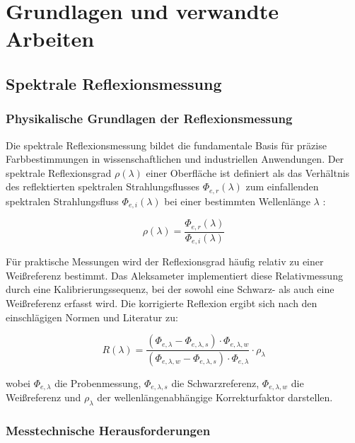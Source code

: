 \chapter{Grundlagen und verwandte Arbeiten}

\section{Spektrale Reflexionsmessung}

\subsection{Physikalische Grundlagen der Reflexionsmessung}

Die spektrale Reflexionsmessung bildet die fundamentale Basis für präzise Farbbestimmungen in wissenschaftlichen und industriellen Anwendungen. Der spektrale Reflexionsgrad $\rho(\lambda)$ einer Oberfläche ist definiert als das Verhältnis des reflektierten spektralen Strahlungsflusses $\Phi_{e,r}(\lambda)$ zum einfallenden spektralen Strahlungsfluss $\Phi_{e,i}(\lambda)$ bei einer bestimmten Wellenlänge $\lambda$ \parencite{DIN5036-1}:

\begin{equation}
\rho(\lambda) = \frac{\Phi_{e,r}(\lambda)}{\Phi_{e,i}(\lambda)}
\label{eq:reflexionsgrad}
\end{equation}

Für praktische Messungen wird der Reflexionsgrad häufig relativ zu einer Weißreferenz bestimmt. Das Aleksameter implementiert diese Relativmessung durch eine Kalibrierungssequenz, bei der sowohl eine Schwarz- als auch eine Weißreferenz erfasst wird. Die korrigierte Reflexion ergibt sich nach den einschlägigen Normen und Literatur \parencite{DIN5036-3, Hentschel2002, Baer2020, Piotrowska2022} zu:

\begin{equation}
R(\lambda) = \frac{(\Phi_{e,\lambda} - \Phi_{e,\lambda,s}) \cdot \Phi_{e,\lambda,w}}{(\Phi_{e,\lambda,w} - \Phi_{e,\lambda,s}) \cdot \Phi_{e,\lambda}} \cdot \rho_\lambda
\label{eq:kali}
\end{equation}

wobei $\Phi_{e,\lambda}$ die Probenmessung, $\Phi_{e,\lambda,s}$ die Schwarzreferenz, $\Phi_{e,\lambda,w}$ die Weißreferenz und $\rho_\lambda$ der wellenlängenabhängige Korrekturfaktor darstellen.

\subsection{Messtechnische Herausforderungen}

